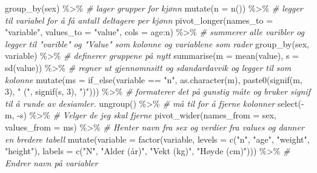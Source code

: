\documentclass[
]{article}
\newenvironment{Shaded}{\begin{snugshade}}{\end{snugshade}}
\newcommand{\AttributeTok}[1]{\textcolor[rgb]{0.77,0.63,0.00}{#1}}
\newcommand{\CommentTok}[1]{\textcolor[rgb]{0.56,0.35,0.01}{\textit{#1}}}
\newcommand{\DecValTok}[1]{\textcolor[rgb]{0.00,0.00,0.81}{#1}}
\newcommand{\FunctionTok}[1]{\textcolor[rgb]{0.00,0.00,0.00}{#1}}
\newcommand{\NormalTok}[1]{#1}
\newcommand{\SpecialCharTok}[1]{\textcolor[rgb]{0.00,0.00,0.00}{#1}}
\newcommand{\StringTok}[1]{\textcolor[rgb]{0.31,0.60,0.02}{#1}}
\begin{document}
\begin{Shaded}
\begin{Highlighting}[]
  \FunctionTok{group\_by}\NormalTok{(sex) }\SpecialCharTok{\%\textgreater{}\%} \CommentTok{\# lager grupper for kjønn}
  \FunctionTok{mutate}\NormalTok{(}\AttributeTok{n =} \FunctionTok{n}\NormalTok{()) }\SpecialCharTok{\%\textgreater{}\%} \CommentTok{\# legger til variabel for å få antall deltagere per kjønn}
   \FunctionTok{pivot\_longer}\NormalTok{(}\AttributeTok{names\_to =} \StringTok{"variable"}\NormalTok{, }
               \AttributeTok{values\_to =} \StringTok{"value"}\NormalTok{, }
               \AttributeTok{cols =}\NormalTok{ age}\SpecialCharTok{:}\NormalTok{n) }\SpecialCharTok{\%\textgreater{}\%} \CommentTok{\# summerer alle varibler og legger til "varible" og "Value" som kolonne og variablene som rader}
   \FunctionTok{group\_by}\NormalTok{(sex, variable) }\SpecialCharTok{\%\textgreater{}\%} \CommentTok{\# definerer gruppene på nytt }
  \FunctionTok{summarise}\NormalTok{(}\AttributeTok{m =} \FunctionTok{mean}\NormalTok{(value), }
            \AttributeTok{s =} \FunctionTok{sd}\NormalTok{(value)) }\SpecialCharTok{\%\textgreater{}\%} \CommentTok{\# regner ut gjennomnsitt og sdandardavvik og legger til som kolonne}
  \FunctionTok{mutate}\NormalTok{(}\AttributeTok{ms =} \FunctionTok{if\_else}\NormalTok{(variable }\SpecialCharTok{==} \StringTok{"n"}\NormalTok{, }\FunctionTok{as.character}\NormalTok{(m), }\FunctionTok{paste0}\NormalTok{(}\FunctionTok{signif}\NormalTok{(m, }\DecValTok{3}\NormalTok{),  }\StringTok{" ("}\NormalTok{, }\FunctionTok{signif}\NormalTok{(s, }\DecValTok{3}\NormalTok{), }\StringTok{")"}\NormalTok{))) }\SpecialCharTok{\%\textgreater{}\%} \CommentTok{\# formaterer det på gunstig måte og bruker signif til å runde av desiamler.}
   \FunctionTok{ungroup}\NormalTok{() }\SpecialCharTok{\%\textgreater{}\%} \CommentTok{\# må til for å fjerne kolonner}
  \FunctionTok{select}\NormalTok{(}\SpecialCharTok{{-}}\NormalTok{m, }\SpecialCharTok{{-}}\NormalTok{s) }\SpecialCharTok{\%\textgreater{}\%} \CommentTok{\# Velger de jeg skal fjerne}
   \FunctionTok{pivot\_wider}\NormalTok{(}\AttributeTok{names\_from =}\NormalTok{ sex, }
              \AttributeTok{values\_from =}\NormalTok{ ms) }\SpecialCharTok{\%\textgreater{}\%} \CommentTok{\# Henter navn fra sex og verdier fra values og danner en bredere tabell}
   \FunctionTok{mutate}\NormalTok{(}\AttributeTok{variable =} \FunctionTok{factor}\NormalTok{(variable, }\AttributeTok{levels =} \FunctionTok{c}\NormalTok{(}\StringTok{"n"}\NormalTok{, }\StringTok{"age"}\NormalTok{, }\StringTok{"weight"}\NormalTok{, }\StringTok{"height"}\NormalTok{), }\AttributeTok{labels =} \FunctionTok{c}\NormalTok{(}\StringTok{"N"}\NormalTok{, }\StringTok{"Alder (år)"}\NormalTok{, }\StringTok{"Vekt (kg)"}\NormalTok{, }\StringTok{"Høyde (cm)"}\NormalTok{))) }\SpecialCharTok{\%\textgreater{}\%} \CommentTok{\# Endrer navn på variabler }

\end{Highlighting}
\end{Shaded}
\end{document}

